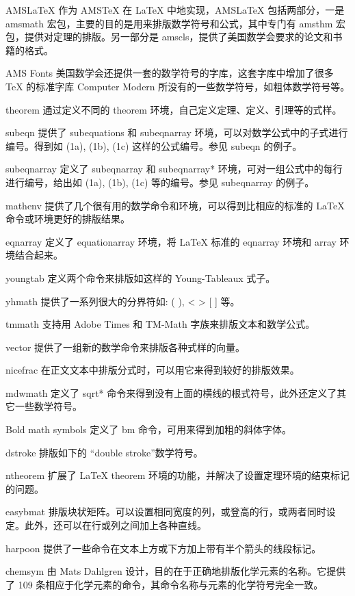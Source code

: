 AMSLaTeX
作为 AMSTeX 在 LaTeX 中地实现，AMSLaTeX 包括两部分，一是 amsmath 宏包，主要的目的是用来排版数学符号和公式，其中专门有 amsthm 宏包，提供对定理的排版。另一部分是 amscls，提供了美国数学会要求的论文和书籍的格式。
 
AMS Fonts
美国数学会还提供一套的数学符号的字库，这套字库中增加了很多 TeX 的标准字库 Computer Modern 所没有的一些数学符号，如粗体数学符号等。
 
theorem
通过定义不同的 theorem 环境，自己定义定理、定义、引理等的式样。
 
subeqn
提供了 subequations 和 subeqnarray 环境，可以对数学公式中的子式进行编号。得到如 (1a), (1b), (1c) 这样的公式编号。参见 subeqn 的例子。
 
subeqnarray
定义了 subeqnarray 和 subeqnarray* 环境，可对一组公式中的每行进行编号，给出如 (1a), (1b), (1c) 等的编号。参见 subeqnarray 的例子。
 
mathenv
提供了几个很有用的数学命令和环境，可以得到比相应的标准的 LaTeX 命令或环境更好的排版结果。
 
eqnarray
定义了 equationarray 环境，将 LaTeX 标准的 eqnarray 环境和 array 环境结合起来。
 
youngtab
定义两个命令来排版如这样的 Young-Tableaux 式子。
 
yhmath
提供了一系列很大的分界符如: ( ), < > [ ] 等。
 
tmmath
支持用 Adobe Times 和 TM-Math 字族来排版文本和数学公式。
 
vector
提供了一组新的数学命令来排版各种式样的向量。
 
nicefrac
在正文文本中排版分式时，可以用它来得到较好的排版效果。
 
mdwmath
定义了 sqrt* 命令来得到没有上面的横线的根式符号，此外还定义了其它一些数学符号。
 
Bold math symbols
定义了 bm 命令，可用来得到加粗的斜体字体。
 
dstroke
排版如下的 “double stroke”数学符号。
 
ntheorem
扩展了 LaTeX theorem 环境的功能，并解决了设置定理环境的结束标记的问题。
 
easybmat
排版块状矩阵。可以设置相同宽度的列，或登高的行，或两者同时设定。此外，还可以在行或列之间加上各种直线。
 
harpoon
提供了一些命令在文本上方或下方加上带有半个箭头的线段标记。
 
chemsym
由 Mats Dahlgren 设计，目的在于正确地排版化学元素的名称。它提供了 109 条相应于化学元素的命令，其命令名称与元素的化学符号完全一致。
 
